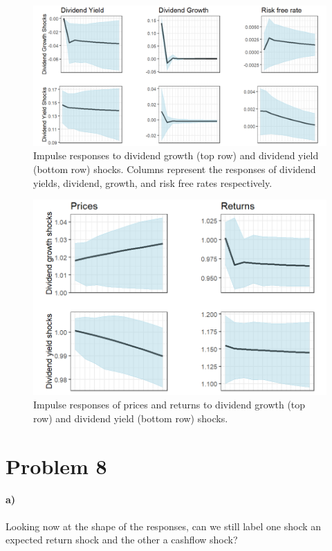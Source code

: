 \documentclass[11pt,letter]{article}
\begin{document}
\begin{figure}[!htb]
	\centering
	\includegraphics[scale = 0.5]{irfs.png}
	\caption{Impulse responses to dividend growth (top row) and dividend yield (bottom row) shocks. Columns represent the responses of dividend yields, dividend, growth, and risk free rates respectively. }
	\label{fig:impulse_responses}
\end{figure}

\begin{figure}[!htb]
	\centering
	\includegraphics[scale = 0.5]{price_and_return_irfs.png}
	\caption{Impulse responses of prices and returns to dividend growth (top row) and dividend yield (bottom row) shocks. }
	\label{fig:price_and_return_irfs}
\end{figure}
\section*{Problem 8}
\paragraph{a)} Looking now at the shape of the responses, can we still label one shock an expected return shock and the other a cashflow shock? \\
\end{document}

